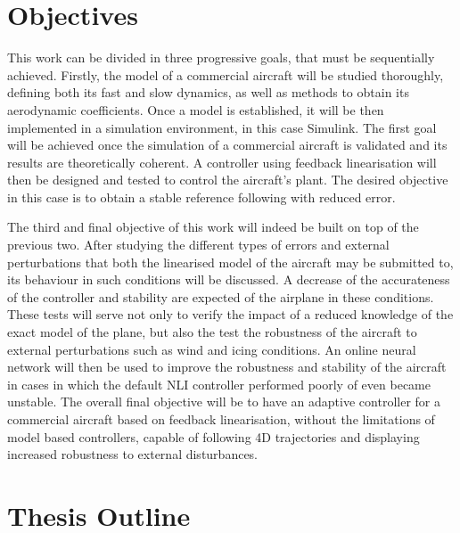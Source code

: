 \section{Objectives}
\label{section:objectives}

This work can be divided in three progressive goals, that must be sequentially achieved. Firstly, the model of a commercial aircraft will be studied thoroughly, defining both its fast and slow dynamics, as well as methods to obtain its aerodynamic coefficients. Once a model is established, it will be then implemented in a simulation environment, in this case Simulink. The first goal will be achieved once the simulation of a commercial aircraft is validated and its results are theoretically coherent. A controller using feedback linearisation will then be designed and tested to control the aircraft's plant. The desired objective in this case is to obtain a stable reference following with reduced error.

The third and final objective of this work will indeed be built on top of the previous two. After studying the different types of errors and external perturbations that both the linearised model of the aircraft may be submitted to, its behaviour in such conditions will be discussed. A decrease of the accurateness of the controller and stability are expected of the airplane in these conditions.
These tests will serve not only to verify the impact of a reduced knowledge of the exact model of the plane, but also the test the robustness of the aircraft to external perturbations such as wind and icing conditions. An online neural network will then be used to improve the robustness and stability of the aircraft in cases in which the default NLI controller performed poorly of even became unstable. The overall final objective will be to have an adaptive controller for a commercial aircraft based on feedback linearisation, without the limitations of model based controllers, capable of following 4D trajectories and displaying increased robustness to external disturbances. 

\section{Thesis Outline}
\label{section:outline}

